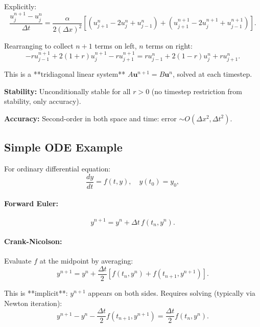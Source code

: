\documentclass[11pt]{article}
\begin{document}
Explicitly:
\begin{equation}
\frac{u_j^{n+1} - u_j^n}{\Delta t} = \frac{\alpha}{2(\Delta x)^2} \left[ (u_{j+1}^n - 2u_j^n + u_{j-1}^n) + (u_{j+1}^{n+1} - 2u_j^{n+1} + u_{j-1}^{n+1}) \right].
\end{equation}

Rearranging to collect $n+1$ terms on left, $n$ terms on right:
\begin{equation}
-r u_{j-1}^{n+1} + 2(1+r) u_j^{n+1} - r u_{j+1}^{n+1} = r u_{j-1}^n + 2(1-r) u_j^n + r u_{j+1}^n.
\end{equation}

This is a **tridiagonal linear system** $A \mathbf{u}^{n+1} = B \mathbf{u}^n$, solved at each timestep.

\textbf{Stability:} Unconditionally stable for all $r > 0$ (no timestep restriction from stability, only accuracy).

\textbf{Accuracy:} Second-order in both space and time: error $\sim O(\Delta x^2, \Delta t^2)$.

\subsection{Simple ODE Example}

For ordinary differential equation:
\begin{equation}
\frac{dy}{dt} = f(t, y), \quad y(t_0) = y_0,
\end{equation}

\paragraph{Forward Euler:}
\begin{equation}
y^{n+1} = y^n + \Delta t \, f(t_n, y^n).
\end{equation}

\paragraph{Crank-Nicolson:}
Evaluate $f$ at the midpoint by averaging:
\begin{equation}
y^{n+1} = y^n + \frac{\Delta t}{2} \left[ f(t_n, y^n) + f(t_{n+1}, y^{n+1}) \right].
\end{equation}

This is **implicit**: $y^{n+1}$ appears on both sides. Requires solving (typically via Newton iteration):
\begin{equation}
y^{n+1} - y^n - \frac{\Delta t}{2} f(t_{n+1}, y^{n+1}) = \frac{\Delta t}{2} f(t_n, y^n).
\end{equation}
\end{document}
